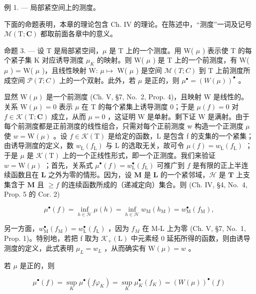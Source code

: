 例 1. --- 局部紧空间上的测度。

下面的命题表明，本章的理论包含 Ch. IV 的理论。在陈述中，“测度”一词及记号 \(\mathcal{M}(\mathrm{T};\mathbf{C})\) 都取前面各章中的意义。

命题 3. --- 设 T 是局部紧空间，\(\mu\) 是 T 上的一个测度。用 W( \(\mu\) ) 表示使 T 的每个紧子集 K 对应诱导测度 \(\mu_{K}\) 的映射。则 W( \(\mu\) ) 是 T 上的一个前测度，有 W(\textbar{} \(\mu\) \textbar) = \textbar W( \(\mu\) )\textbar，且线性映射 W: \(\mu \mapsto\) W( \(\mu\) ) 是空间 \(\mathcal{M}(T;C)\) 到 T 上前测度所成空间 \(\mathcal{P}(T;C)\) 上的一个双射。此外，若 \(\mu\) 是正的，则 \(\mu^{\bullet} = (W(\mu))^{\bullet}\) 。

显然 \(\mathrm{W}(\mu)\) 是一个前测度 (Ch. V, §7, No.~2, Prop. 4)，且映射 W 是线性的。关系 \(\mathrm{W}(\mu)=0\) 表示 \(\mu\) 在 T 的每个紧集上诱导测度 0；于是 \(\mu(f)=0\) 对 \(f\in\mathcal{K}(\mathrm{T};\mathbf{C})\) 成立，从而 \(\mu=0\) ，这证明 W 是单射。剩下证 W 是满射。由于每个前测度都是正前测度的线性组合，只需对每个正前测度 w 构造一个正测度 \(\mu\) 使 \(w=\mathrm{W}(\mu)\) 。设 \(f\in\mathcal{K}(\mathrm{T})\) 是给定的函数，L 是包含 f 的支集的一个紧集；由诱导测度的定义，数 \(w_{\mathrm{L}}(f_{\mathrm{L}})\) 与 L 的选取无关，故可令 \(\mu(f)=w_{\mathrm{L}}(f_{\mathrm{L}})\) ；于是 \(\mu\) 是 \(\mathcal{K}(\mathrm{T})\) 上的一个正线性形式，即一个正测度。我们来验证 \(w = \mathrm{W}(\mu)\) ；首先，关系式 \(\mu^{\bullet}(f) = w_{\mathrm{L}}^{\bullet}(f_{\mathrm{L}})\) 可推广到 \(f\) 是有限的正上半连续函数且在 \(\mathbf{L}\) 之外为零的情形。因为，设 \(\mathbf{M}\) 是 \(\mathbf{L}\) 的一个紧邻域，\(\mathcal{H}\) 是 \(\mathbf{T}\) 上支集含于 \(\mathbf{M}\) 且 \(\geqslant f\) 的连续函数所成的（递减定向）集合。则 (Ch. IV, §4, No.~4, Prop. 5 的 Cor. 2)

\[
\mu^ {\bullet} (f) = \inf _ {h \in \mathscr {H}} \mu (h) = \inf _ {h \in \mathscr {H}} w _ {\mathrm{M}} (h _ {\mathrm{M}}) = w _ {\mathrm{M}} ^ {\bullet} (f _ {\mathrm{M}}),
\]

另一方面，\(w_{\mathrm{M}}^{\bullet}(f_{\mathrm{M}}) = w_{\mathrm{L}}^{\bullet}(f_{\mathrm{L}})\) ，因为 \(f_{M}\) 在 M-L 上为零 (Ch. V, §7, No.~1, Prop. 1)。特别地，若把 f 取为 \(\mathcal{K}_{+}(\mathrm{L})\) 中元素经 0 延拓所得的函数，则由诱导测度的定义，此式表明 \(\mu_{L} = w_{L}\) ，从而确实有 \(\mathrm{W}(\mu) = w\) 。

若 \(\mu\) 是正的，则

\[
\mu^ {\bullet} (f) = \sup _ {K} \mu^ {\bullet} (f \varphi_ {K}) = \sup _ {K} \mu_ {K} ^ {\bullet} (f _ {K}) = (W (\mu)) ^ {\bullet} (f)
\]

